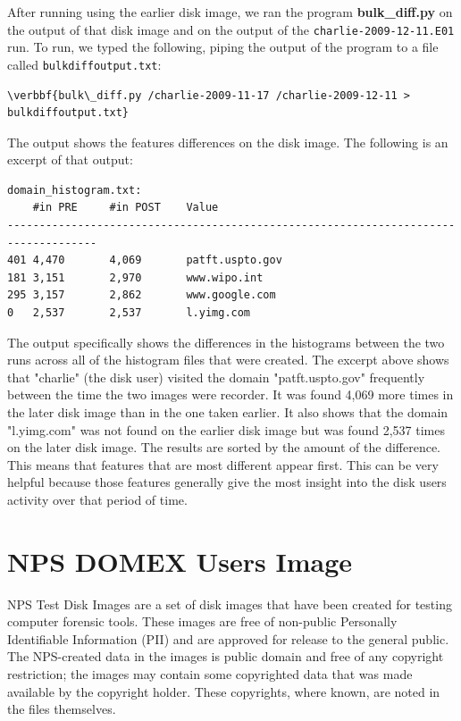 After running \bulk using the earlier disk image, we ran the program \textbf{bulk\_diff.py} on the output of that disk image and on the output of the \texttt{charlie-2009-12-11.E01} run. To run, we typed the following, piping the output of the program to a file called \texttt{bulkdiffoutput.txt}:
\begin{Verbatim}[commandchars=\\\{\}]
\verbbf{bulk\_diff.py /charlie-2009-11-17 /charlie-2009-12-11 > bulkdiffoutput.txt}
\end{Verbatim} 
The output shows the features differences on the disk image. The following is an excerpt of that output:
\lstset{style=customfile}
\begin{lstlisting}
domain_histogram.txt:
	#in PRE		#in POST	Value
------------------------------------------------------------------------------------
401	4,470		4,069		patft.uspto.gov
181	3,151		2,970		www.wipo.int
295	3,157		2,862		www.google.com
0	2,537		2,537		l.yimg.com
\end{lstlisting}
The output specifically shows the differences in the histograms between the two runs across all of the histogram files that were created. The excerpt above shows that "charlie" (the disk user) visited the domain "patft.uspto.gov" frequently between the time the two images were recorder. It was found 4,069 more times in the later disk image than in the one taken earlier. It also shows that the domain "l.yimg.com" was not found on the earlier disk image but was found 2,537 times on the later disk image. The results are sorted by the amount of the difference. This means that features that are most different appear first. This can be very helpful because those features generally give the most insight into the disk users activity over that period of time.

\section{NPS DOMEX Users Image}
NPS Test Disk Images are a set of disk images that have been created for testing computer forensic tools. These images are free of non-public Personally Identifiable Information (PII) and are approved for release to the general public. The NPS-created data in the images is public domain and free of any copyright restriction; the images may contain some copyrighted data that was made available by the copyright holder. These copyrights, where known, are noted in the files themselves\cite{npsdiskimages}. \\

